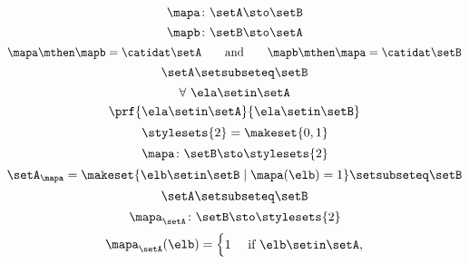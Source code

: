 \begin{forslides}
    \begin{equation}
        \label{eq:slides_session2_183}
        \mapa\colon \setA \sto \setB
    \end{equation}
    \begin{equation}
        \label{eq:slides_session2_184}
        \mapb \colon \setB \sto \setA
    \end{equation}
    \begin{equation}
        \label{eq:slides_session2_185}
        \mapa \mthen \mapb = \catidat\setA \qquad \text{and}  \qquad \mapb \mthen \mapa = \catidat\setB
    \end{equation}
    \begin{equation}
        \label{eq:slides_session2_186}
        \setA \setsubseteq \setB
    \end{equation}
    \begin{equation}
        \label{eq:slides_session2_187}
        \forall \ \ela \setin\setA
    \end{equation}
    \begin{equation}
        \label{eq:slides_session2_188}
        \prf{
            \ela \setin\setA
        }{
            \ela \setin\setB
        }
    \end{equation}
    \begin{equation}
        \label{eq:slides_session2_189}
        \stylesets{2} = \makeset{ 0, 1}
    \end{equation}
    \begin{equation}
        \label{eq:slides_session2_190}
        \mapa \colon \setB \sto \stylesets{2}
    \end{equation}
    \begin{equation}
        \label{eq:slides_session2_191}
        \setA_\mapa = \makeset{ \elb \setin\setB \mid \mapa(\elb) = 1 } \setsubseteq \setB
    \end{equation}
    \begin{equation}
        \label{eq:slides_session2_192}
        \setA \setsubseteq \setB
    \end{equation}
    \begin{equation}
        \label{eq:slides_session2_193}
        \mapa_\setA \colon \setB \sto \stylesets{2}
    \end{equation}
    \begin{equation}
        \label{eq:slides_session2_194}
        \mapa_\setA(\elb) = \begin{cases}
            1 & \text{ if }\elb\setin\setA, \\

\end{cases}
\end{equation}
\end{forslides}
